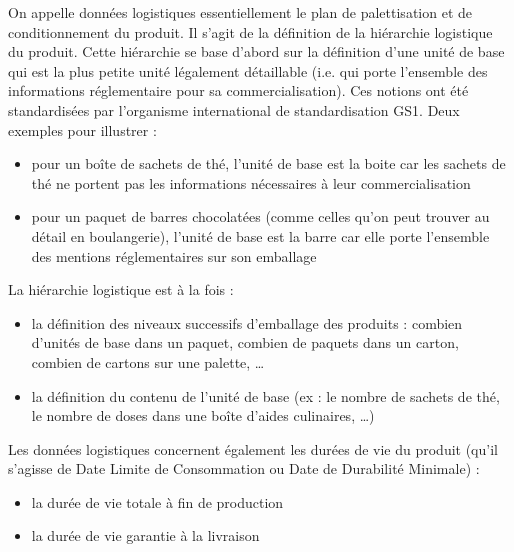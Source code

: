                 On appelle données logistiques essentiellement le plan de palettisation et de conditionnement du produit.
                Il s'agit de la définition de la \og hiérarchie logistique \fg du produit.
                Cette hiérarchie se base d'abord sur la définition d'une \og unité de base \fg qui est la plus petite unité légalement détaillable (i.e. qui porte l'ensemble des informations réglementaire pour sa commercialisation).
                Ces notions ont été standardisées par l'organisme international de standardisation GS1\cite{GDSNimplementationGuide}.
                Deux exemples pour illustrer : 
                \begin{itemize}
                    \item pour un boîte de sachets de thé, l'unité de base est la boite car les sachets de thé ne portent pas les informations nécessaires à leur commercialisation
                    \item pour un paquet de barres chocolatées (comme celles qu'on peut trouver au détail en boulangerie), l'unité de base est la barre car elle porte l'ensemble des mentions réglementaires sur son emballage
                \end{itemize}
                La hiérarchie logistique est à la fois :
                \begin{itemize}
                    \item la définition des niveaux successifs d'emballage des produits  : combien d'unités de base dans un paquet, combien de paquets dans un carton, combien de cartons sur une palette, \dots
                    \item la définition du contenu de l'unité de base (ex : le nombre de sachets de thé, le nombre de doses dans une boîte d'aides culinaires, \dots)
                \end{itemize}

                Les données logistiques concernent également les durées de vie du produit (qu'il s'agisse de Date Limite de Consommation ou Date de Durabilité Minimale) :
                \begin{itemize}
                    \item la durée de vie totale à fin de production
                    \item la durée de vie garantie à la livraison
                \end{itemize}
                
